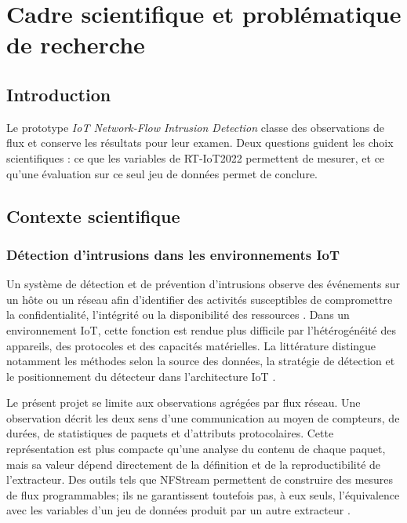 \chapter{Cadre scientifique et probl\'ematique de recherche}
\label{chap:cadre-recherche}

\section{Introduction}

Le prototype \emph{IoT Network-Flow Intrusion Detection} classe des observations
de flux et conserve les résultats pour leur examen. Deux questions guident les
choix scientifiques : ce que les variables de RT-IoT2022 permettent de mesurer,
et ce qu'une évaluation sur ce seul jeu de données permet de conclure.

\section{Contexte scientifique}

\subsection{D\'etection d'intrusions dans les environnements IoT}

Un syst\`eme de d\'etection et de pr\'evention d'intrusions observe des \'ev\'enements
sur un h\^ote ou un r\'eseau afin d'identifier des activit\'es susceptibles de
compromettre la confidentialit\'e, l'int\'egrit\'e ou la disponibilit\'e des
ressources \citep{scarfone_guide_2007}. Dans un environnement IoT, cette fonction
est rendue plus difficile par l'h\'et\'erog\'en\'eit\'e des appareils, des protocoles
et des capacit\'es mat\'erielles. La litt\'erature distingue notamment les m\'ethodes
selon la source des donn\'ees, la strat\'egie de d\'etection et le positionnement du
d\'etecteur dans l'architecture IoT \citep{zarpelao_survey_2017}.

Le pr\'esent projet se limite aux observations agr\'eg\'ees par flux r\'eseau. Une
observation d\'ecrit les deux sens d'une communication au moyen de compteurs, de
dur\'ees, de statistiques de paquets et d'attributs protocolaires. Cette
repr\'esentation est plus compacte qu'une analyse du contenu de chaque paquet,
mais sa valeur d\'epend directement de la d\'efinition et de la reproductibilit\'e
de l'extracteur. Des outils tels que NFStream permettent de construire des
mesures de flux programmables; ils ne garantissent toutefois pas, \`a eux seuls,
l'\'equivalence avec les variables d'un jeu de donn\'ees produit par un autre
extracteur \citep{aouini_nfstream_2022}.

